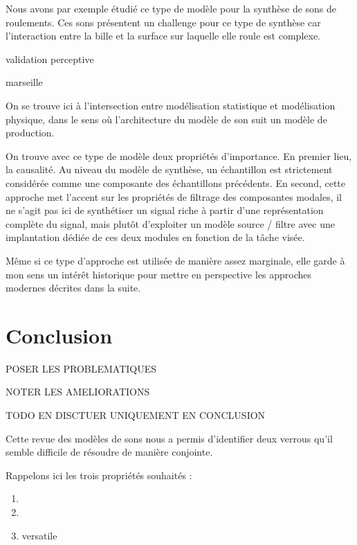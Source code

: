 Nous avons par exemple étudié ce type de modèle pour la synthèse de sons de roulements. Ces sons présentent un challenge pour ce type de synthèse car l'interaction entre la bille et la surface sur laquelle elle roule est complexe.

\cite{LagrangeTasslp10}

 validation perceptive

\cite{Murphy11a}

marseille\cite{conan2014synthesis}

On se trouve ici à l'intersection entre modélisation statistique et modélisation physique, dans le sens où l'architecture du modèle de son suit un modèle de production.



On trouve avec ce type de modèle deux propriétés d'importance. En premier lieu, la causalité. Au niveau du modèle de synthèse, un échantillon est strictement considérée comme une composante des échantillons précédents.  En second, cette approche met l'accent sur les propriétés de filtrage des composantes modales, il ne s'agit pas ici de synthétiser un signal riche à partir d'une représentation complète du signal, mais plutôt d'exploiter un modèle source / filtre avec une implantation dédiée de ces deux modules en fonction de la tâche visée.

Même si ce type d'approche est utilisée de manière assez marginale, elle garde à mon sens un intérêt historique pour mettre en perspective les approches modernes décrites dans la suite.


\section{ \nmu Conclusion}

POSER LES PROBLEMATIQUES

NOTER LES AMELIORATIONS






TODO EN DISCTUER UNIQUEMENT EN CONCLUSION

Cette revue des modèles de sons nous a permis d'identifier deux verrous qu'il semble difficile de résoudre de manière conjointe.

Rappelons ici les trois propriétés souhaités :
\begin{enumerate}
  \item
  \item
  \item versatile
\end{enumerate}

